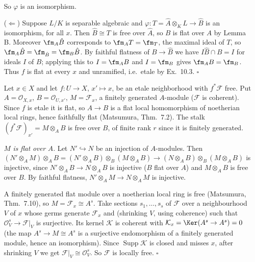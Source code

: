 \documentclass[11pt]{article}
\begin{document}
So $\varphi$ is an isomorphism.

($\Leftarrow$) Suppose $L/K$ is separable algebraic and $\varphi:T=\hat A\otimes_KL\to\hat B$ is an isomorphism, for all $x$. Then $\hat B\cong T$ is free over $\hat A$, so $B$ is flat over $A$ by Lemma B. Moreover $\fm_A\hat B$ corresponds to $\fm_AT=\fm_T$, the maximal ideal of $T$, so $\fm_A\hat B=\fm_{\hat B}=\fm_B\hat B$. By faithful flatness of $B\to\hat B$ we have $I\hat B\cap B=I$ for ideals $I$ of $B$; applying this to $I=\fm_AB$ and $I=\fm_B$ gives $\fm_AB=\fm_B$. Thus $f$ is flat at every $x$ and unramified, i.e.\ etale by Ex.~10.3. \hfill$\square$

\pf
Let $x\in X$ and let $f:U\to X$, $x'\mapsto x$, be an etale neighborhood with $f^*\mathcal F$ free. Put $A=\mathcal O_{X,x}$, $B=\mathcal O_{U,x'}$, $M=\mathcal F_x$, a finitely generated $A$-module ($\mathcal F$ is coherent). Since $f$ is etale it is flat, so $A\to B$ is a flat local homomorphism of noetherian local rings, hence faithfully flat (Matsumura, Thm.~7.2). The stalk $(f^*\mathcal F)_{x'}=M\otimes_AB$ is free over $B$, of finite rank $r$ since it is finitely generated.

\emph{$M$ is flat over $A$.} Let $N'\hookrightarrow N$ be an injection of $A$-modules. Then $(N'\otimes_AM)\otimes_AB=(N'\otimes_AB)\otimes_B(M\otimes_AB)\to(N\otimes_AB)\otimes_B(M\otimes_AB)$ is injective, since $N'\otimes_AB\to N\otimes_AB$ is injective ($B$ flat over $A$) and $M\otimes_AB$ is free over $B$. By faithful flatness, $N'\otimes_AM\to N\otimes_AM$ is injective.

A finitely generated flat module over a noetherian local ring is free (Matsumura, Thm.~7.10), so $M=\mathcal F_x\cong A^s$. Take sections $s_1,\dots,s_s$ of $\mathcal F$ over a neighbourhood $V$ of $x$ whose germs generate $\mathcal F_x$ and (shrinking $V$, using coherence) such that $\mathcal O_V^s\to\mathcal F|_V$ is surjective. Its kernel $\mathcal K$ is coherent with $\mathcal K_x=\Ker(A^s\to A^s)=0$ (the map $A^s\to M\cong A^s$ is a surjective endomorphism of a finitely generated module, hence an isomorphism). Since $\operatorname{Supp}\mathcal K$ is closed and misses $x$, after shrinking $V$ we get $\mathcal F|_V\cong\mathcal O_V^s$. So $\mathcal F$ is locally free. \hfill$\square$
\end{document}

